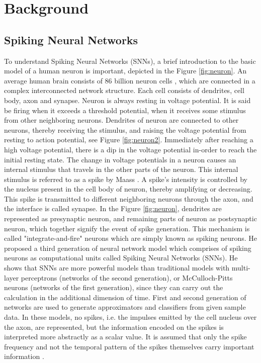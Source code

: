 \documentclass[11pt,twoside]{article}
\begin{document}
\section{Background}
\label{sec:background}

\subsection{Spiking Neural Networks}
To understand Spiking Neural Networks (SNNs), a brief introduction to the basic model of a human neuron is important, depicted in the Figure \ref{fig:neuron}. An average human brain consists of 86 billion neuron cells \cite{azevedo2009equal}, which are connected in a complex interconnected network structure. Each cell consists of dendrites, cell body, axon and synapse. Neuron is always resting in voltage potential. It is said be firing when it exceeds a threshold potential, when it receives some stimulus from other neighboring neurons. Dendrites of neuron are connected to other neurons, thereby receiving the stimulus, and raising the voltage potential from resting to action potential, see Figure \ref{fig:neuron2}. Immediately after reaching a high voltage potential, there is a dip in the voltage potential in-order to reach the initial resting state. The change in voltage potentials in a neuron causes an internal stimulus that travels in the other parts of the neuron. This internal stimulus is referred to as a spike by Maass \cite{maass1997networks}. A spike's intensity is controlled by the nucleus present in the cell body of neuron, thereby amplifying or decreasing. This spike is transmitted to different neighboring neurons through the axon, and the interface is called synapse. In the Figure \ref{fig:neuron}, dendrites are represented as presynaptic neuron, and remaining parts of neuron as postsynaptic neuron, which together signify the event of spike generation. This mechanism is called "integrate-and-fire" neurons which are simply known as spiking neurons. He proposed a third generation of neural network model which comprises of spiking neurons as computational units called Spiking Neural Networks (SNNs). He shows that SNNs are more powerful models than traditional models with multi-layer perceptrons (networks of the second generation), or McCulloch-Pitts neurons (networks of the first generation), since they can carry out the calculation in the additional dimension of time. First and second generation of networks are used to generate approximators and classifiers from given sample data. In these models, no spikes, i.e. the impulses emitted by the cell nucleus over the axon, are represented, but the information encoded on the spikes is interpreted more abstractly as a scalar value. It is assumed that only the spike frequency and not the temporal pattern of the spikes themselves carry important information \cite{durer2001esynn}.
\end{document}
